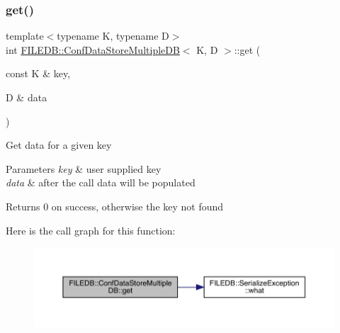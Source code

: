 \subsubsection{\texorpdfstring{get()}{get()}\hspace{0.1cm}{\footnotesize\ttfamily [1/3]}}
{\footnotesize\ttfamily template$<$typename K, typename D$>$ \\
int \mbox{\hyperlink{classFILEDB_1_1ConfDataStoreMultipleDB}{F\+I\+L\+E\+D\+B\+::\+Conf\+Data\+Store\+Multiple\+DB}}$<$ K, D $>$\+::get (\begin{DoxyParamCaption}\item[{const K \&}]{key,  }\item[{D \&}]{data }\end{DoxyParamCaption})\hspace{0.3cm}{\ttfamily [inline]}}

Get data for a given key 
\begin{DoxyParams}{Parameters}
{\em key} & user supplied key \\
\hline
{\em data} & after the call data will be populated \\
\hline
\end{DoxyParams}
\begin{DoxyReturn}{Returns}
0 on success, otherwise the key not found 
\end{DoxyReturn}
Here is the call graph for this function\+:
\nopagebreak
\begin{figure}[H]
\begin{center}
\leavevmode
\includegraphics[width=350pt]{d3/dc0/classFILEDB_1_1ConfDataStoreMultipleDB_a15c985c05120d6076e890f0507ceade7_cgraph}
\end{center}
\end{figure}
\mbox{\label{classFILEDB_1_1ConfDataStoreMultipleDB_a15c985c05120d6076e890f0507ceade7}} 
